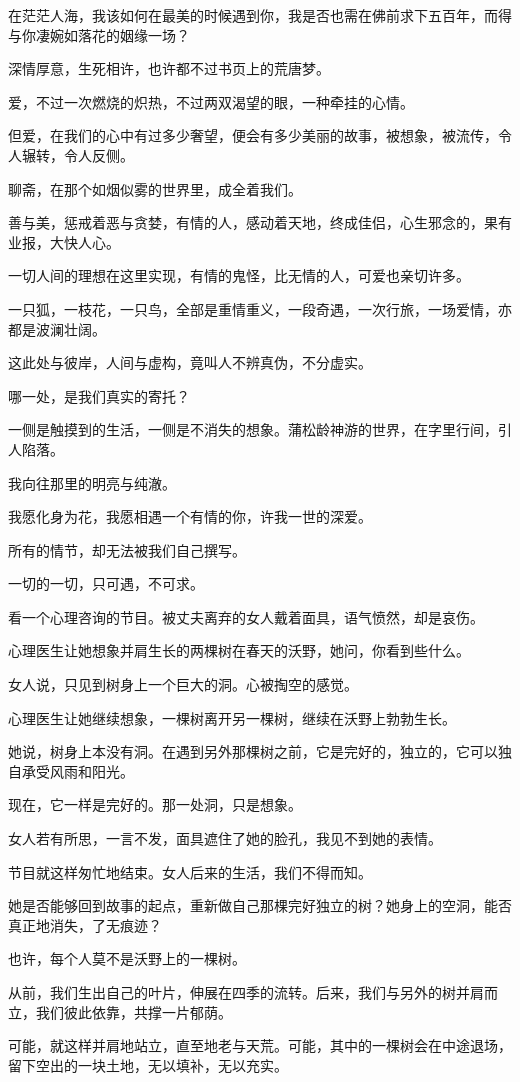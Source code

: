 \documentclass[12pt,a4paper]{article}
\def\blankrev{\vspace{1ex}}									%
\begin{document}
		\blankrev
		在茫茫人海，我该如何在最美的时候遇到你，我是否也需在佛前求下五百年，而得与你凄婉如落花的姻缘一场？\par
		深情厚意，生死相许，也许都不过书页上的荒唐梦。\par
		爱，不过一次燃烧的炽热，不过两双渴望的眼，一种牵挂的心情。\par
		但爱，在我们的心中有过多少奢望，便会有多少美丽的故事，被想象，被流传，令人辗转，令人反侧。\par
		聊斋，在那个如烟似雾的世界里，成全着我们。\par
		善与美，惩戒着恶与贪婪，有情的人，感动着天地，终成佳侣，心生邪念的，果有业报，大快人心。\par
		一切人间的理想在这里实现，有情的鬼怪，比无情的人，可爱也亲切许多。\par
		一只狐，一枝花，一只鸟，全部是重情重义，一段奇遇，一次行旅，一场爱情，亦都是波澜壮阔。\par
		这此处与彼岸，人间与虚构，竟叫人不辨真伪，不分虚实。\par
		哪一处，是我们真实的寄托？\par
		一侧是触摸到的生活，一侧是不消失的想象。蒲松龄神游的世界，在字里行间，引人陷落。\par
		我向往那里的明亮与纯澈。\par
		我愿化身为花，我愿相遇一个有情的你，许我一世的深爱。\par
		所有的情节，却无法被我们自己撰写。\par
		一切的一切，只可遇，不可求。

	\endwriting



		看一个心理咨询的节目。被丈夫离弃的女人戴着面具，语气愤然，却是哀伤。

		心理医生让她想象并肩生长的两棵树在春天的沃野，她问，你看到些什么。\par
		女人说，只见到树身上一个巨大的洞。心被掏空的感觉。\par
		心理医生让她继续想象，一棵树离开另一棵树，继续在沃野上勃勃生长。\par
		她说，树身上本没有洞。在遇到另外那棵树之前，它是完好的，独立的，它可以独自承受风雨和阳光。\par
		现在，它一样是完好的。那一处洞，只是想象。

		女人若有所思，一言不发，面具遮住了她的脸孔，我见不到她的表情。\par
		节目就这样匆忙地结束。女人后来的生活，我们不得而知。\par
		她是否能够回到故事的起点，重新做自己那棵完好独立的树？她身上的空洞，能否真正地消失，了无痕迹？\par
		也许，每个人莫不是沃野上的一棵树。\par
		从前，我们生出自己的叶片，伸展在四季的流转。后来，我们与另外的树并肩而立，我们彼此依靠，共撑一片郁荫。\par
		可能，就这样并肩地站立，直至地老与天荒。可能，其中的一棵树会在中途退场，留下空出的一块土地，无以填补，无以充实。
\end{document}
